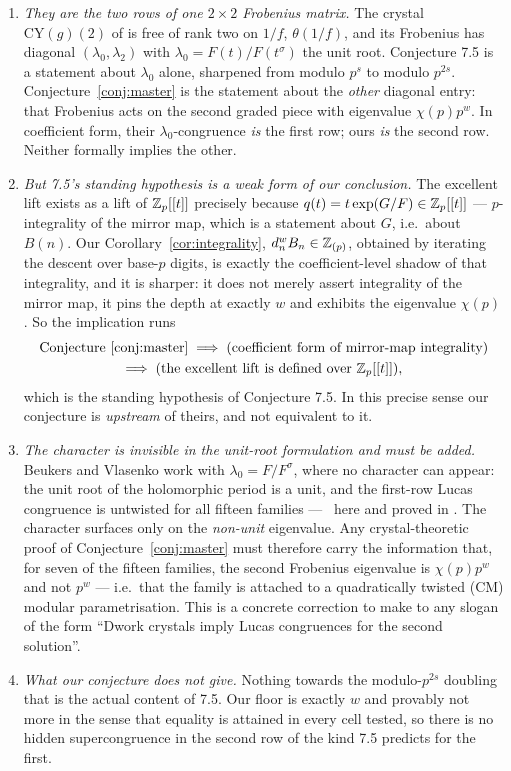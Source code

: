 \begin{enumerate}[leftmargin=1.7em]
\item \emph{They are the two rows of one $2\times2$ Frobenius matrix.} The crystal
  $\mathrm{CY}(g)(2)$ of \cite{BVthree} is free of rank two on $1/f$, $\theta(1/f)$, and
  its Frobenius has diagonal $(\lambda_0,\lambda_2)$ with $\lambda_0=F(t)/F(t^\sigma)$ the
  unit root. Conjecture 7.5 is a statement about $\lambda_0$ alone, sharpened from modulo
  $p^s$ to modulo $p^{2s}$. Conjecture~\ref{conj:master} is the statement about the
  \emph{other} diagonal entry: that Frobenius acts on the second graded piece with
  eigenvalue $\chi(p)p^{w}$. In coefficient form, their $\lambda_0$-congruence \emph{is}
  the first row; ours \emph{is} the second row. Neither formally implies the other.
\item \emph{But 7.5's standing hypothesis is a weak form of our conclusion.} The excellent
  lift exists as a lift of $\mathbb{Z}_p[[t]]$ precisely because
  $q(t)=t\exp(G/F)\in\mathbb{Z}_p[[t]]$ --- $p$-integrality of the mirror map, which is a
  statement about $G$, i.e.\ about $B(n)$. Our Corollary~\ref{cor:integrality},
  $d_n^wB_n\in\mathbb{Z}_{(p)}$, obtained by iterating the descent over base-$p$ digits, is exactly the
  coefficient-level shadow of that integrality, and it is sharper: it does not merely
  assert integrality of the mirror map, it pins the depth at exactly $w$ and exhibits the
  eigenvalue $\chi(p)$. So the implication runs
  \[
   \begin{gathered}
    \text{Conjecture~\ref{conj:master}}\;\Longrightarrow\;
    \text{(coefficient form of mirror-map integrality)}\\
    \Longrightarrow\;
    \text{(the excellent lift is defined over $\mathbb{Z}_p[[t]]$)},
   \end{gathered}
  \]
  which is the standing hypothesis of Conjecture 7.5. In this precise sense our conjecture
  is \emph{upstream} of theirs, and not equivalent to it.
\item \emph{The character is invisible in the unit-root formulation and must be added.}
  Beukers and Vlasenko work with $\lambda_0=F/F^\sigma$, where no character can appear:
  the unit root of the holomorphic period is a unit, and the first-row Lucas congruence is
  untwisted for all fifteen families --- \Verified\ here and proved in
  \cite{MalikStraub}. The character surfaces only on the \emph{non-unit} eigenvalue. Any
  crystal-theoretic proof of Conjecture~\ref{conj:master} must therefore carry the
  information that, for seven of the fifteen families, the second Frobenius eigenvalue is
  $\chi(p)p^{w}$ and not $p^{w}$ --- i.e.\ that the family is attached to a quadratically
  twisted (CM) modular parametrisation. This is a concrete correction to make to any
  slogan of the form ``Dwork crystals imply Lucas congruences for the second solution''.
\item \emph{What our conjecture does not give.} Nothing towards the modulo-$p^{2s}$
  doubling that is the actual content of 7.5. Our floor is exactly $w$ and provably not
  more in the sense that equality is attained in every cell tested, so there is no hidden
  supercongruence in the second row of the kind 7.5 predicts for the first.
\end{enumerate}

